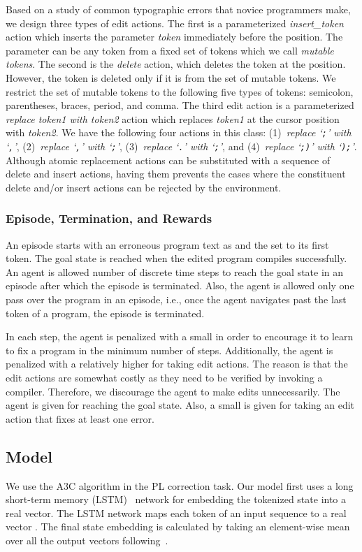\documentclass{article}
\newcommand{\code}[1]{\texttt{#1}}
\begin{document}
Based on a study of common typographic errors that novice programmers
make, we design three types of edit actions.
The first is a parameterized \emph{insert\_token} action which inserts the parameter \emph{token} immediately before the  position.
The parameter can be any token from a fixed set of tokens which we call \emph{mutable tokens}.
The second is the \emph{delete} action, which deletes the token at the  position.
However, the token is deleted only if it is from the set of mutable tokens.
We restrict the set of mutable tokens to the following five types
of tokens: semicolon, parentheses, braces, period, and comma.
The third edit action is a parameterized \emph{replace token1 with token2} action which replaces \emph{token1} at the cursor position with \emph{token2}. We have the following four actions in this class: (1)~\emph{replace `\code{;}' with `\code{,}'},
(2)~\emph{replace `\code{,}' with `\code{;}'},
(3)~\emph{replace `\code{.}' with `\code{;}'}, and (4)~\emph{replace `\code{;)}' with `\code{);}'}.
Although atomic replacement actions can be substituted with a sequence of delete and insert actions, having them prevents the cases where the constituent delete and/or insert actions can be rejected by the environment.

\subsubsection{Episode, Termination, and Rewards} An episode starts with an erroneous program text as  and the  set to its first token. 
The goal state is reached when the edited program compiles successfully.
An agent is allowed  number of discrete time steps to reach the goal state in an episode after which the episode is terminated. 
Also, the agent is allowed only one pass over the program in an episode, i.e., once the agent navigates past the last token of a program, the episode is terminated. 

In each step, the agent is penalized with a small  in order to encourage it to learn to fix a program in the minimum number of steps.
Additionally, the agent is penalized with a relatively higher  for taking edit actions.
The reason is that the edit actions are somewhat costly as they need to be verified by invoking a compiler. Therefore, we discourage the agent to make edits unnecessarily.
The agent is given  for reaching the goal state.
Also, a small  is given for taking an edit action that fixes at least one error.

\subsection{Model}
We use the A3C algorithm in the PL correction task. 
Our model first uses a long short-term memory (LSTM)~\cite{hochreiter1997long} network for embedding the tokenized state into a real vector. 
The LSTM network maps each token  of an input sequence  to a real vector .
The final state embedding is calculated by taking an element-wise mean over all the output vectors  following~\cite{narasimhan2015language}.
\end{document}
